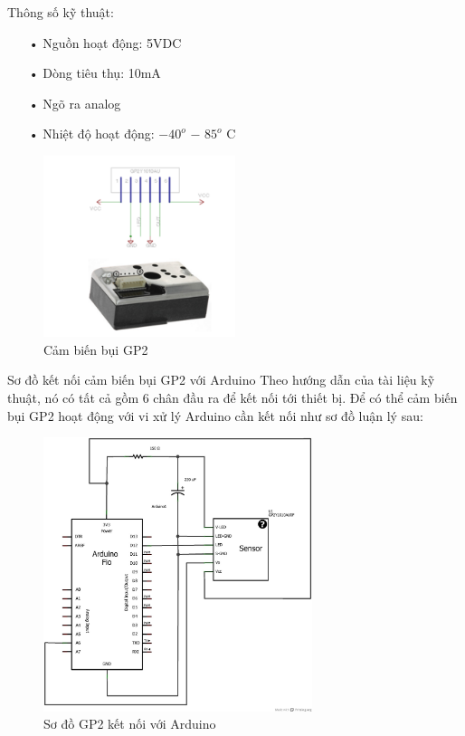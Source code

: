 Thông số kỹ thuật:
\begin{itemize}
\item[•]Nguồn hoạt động: 5VDC
\item[•]Dòng tiêu thụ: 10mA
\item[•]Ngõ ra analog
\item[•]Nhiệt độ hoạt động: $-40^{o}$ $-$ $85 ^{o}$ C
\end{itemize}

\begin{figure}[H]
	\centering    
	\includegraphics[width=0.5\textwidth]{gp2}
	\caption[Cảm biến bụi GP2 ]{Cảm biến bụi GP2}
	\label{fig:gp2}
\end{figure}

Sơ đồ kết nối cảm biến bụi GP2 với Arduino
Theo hướng dẫn của tài liệu kỹ thuật, nó có tất cả gồm 6 chân đầu ra để kết nối tới thiết bị. Để có thể cảm biến bụi GP2 hoạt động với vi xử lý Arduino cần kết nối như sơ đồ luận lý sau:

\begin{figure}[H]
	\centering    
	\includegraphics[width=0.7\textwidth]{sodogp2}
	\caption[Sơ đồ GP2 kết nối với Arduino ]{Sơ đồ GP2 kết nối với Arduino}
	\label{fig:sodogp2}
\end{figure}






